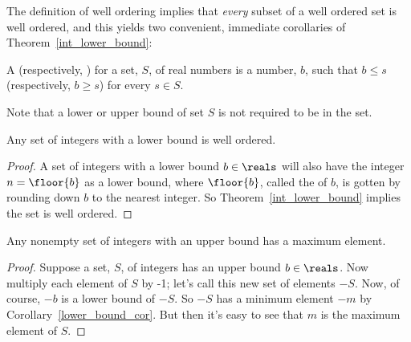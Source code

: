 The definition of well ordering implies that \emph{every} subset of a
well ordered set is well ordered, and this yields two convenient,
immediate corollaries of Theorem~\ref{int_lower_bound}:

\begin{definition}
A  (respectively, ) for a set,
$S$, of real numbers is a number, $b$, such that $b \leq s$
(respectively, $b \geq s$) for every $s \in S$.
\end{definition}
Note that a lower or upper bound of set $S$ is not required to be in
the set.

\begin{corollary}\label{lower_bound_cor}
Any set of integers with a lower bound is well ordered.
\end{corollary}

\begin{proof}
A set of integers with a lower bound $b \in \reals$ will also have the
integer $n = \floor{b}$ as a lower bound, where $\floor{b}$, called
the  of $b$, is gotten by rounding down $b$ to the nearest
integer.  So Theorem~\ref{int_lower_bound} implies the set is well
ordered.
\end{proof}


\begin{corollary}\label{upper_bound_cor}
Any nonempty set of integers with an upper bound has a maximum
element.
\end{corollary}

\begin{proof}
Suppose a set, $S$, of integers has an upper bound $b \in \reals$.
Now multiply each element of $S$ by -1; let's call this new set of
elements $-S$.  Now, of course, $-b$ is a lower bound of $-S$.  So
$-S$ has a minimum element $-m$ by Corollary~\ref{lower_bound_cor}.
But then it's easy to see that $m$ is the maximum element of $S$.
\end{proof}


